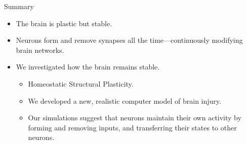 \begin{frame}[c]{Summary}
  \begin{itemize}
    \item \alert{The brain is plastic but stable}.
    \item \alert{Neurons form and remove synapses all the time}---continuously modifying brain networks.
      \pause{}
    \item \alert{We investigated how the brain remains stable.}
      \begin{itemize}
        \item Homeostatic Structural Plasticity.
        \item We developed a new, realistic computer model of brain injury.
        \item Our simulations suggest that neurons maintain their own activity by forming and removing inputs, and transferring their states to other neurons.
      \end{itemize}
  \end{itemize}
\end{frame}

